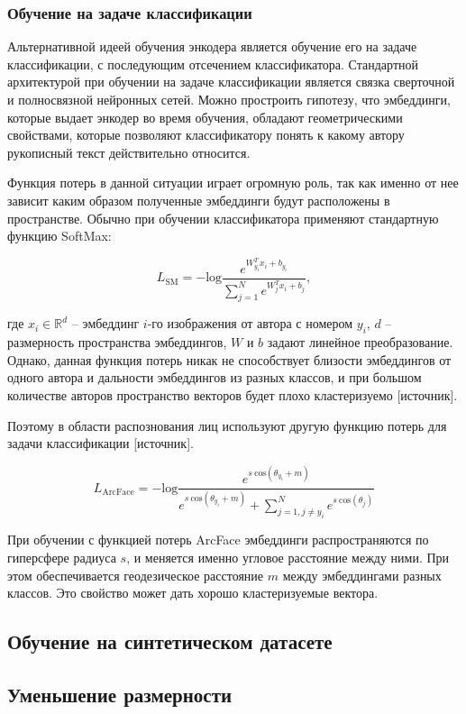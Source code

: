 \subsubsection{Обучение на задаче классификации}

Альтернативной идеей обучения энкодера является обучение его на задаче классификации, с последующим отсечением классификатора. Стандартной архитектурой при обучении на задаче классификации является связка сверточной и полносвязной нейронных сетей. Можно простроить гипотезу, что эмбеддинги, которые выдает энкодер во время обучения, обладают геометрическими свойствами, которые позволяют классификатору понять к какому автору рукописный текст действительно относится.

Функция потерь в данной ситуации играет огромную роль, так как именно от нее зависит каким образом полученные эмбеддинги будут расположены в пространстве. Обычно при обучении классификатора применяют стандартную функцию SoftMax:

$$
L_{\text{SM}} = -\text{log} \frac{e^{W_{y_i}^T x_i + b_{y_i}}}{\sum_{j=1}^{N} e^{W_{j}^T x_i + b_{j}}},
$$

\noindent
где $x_i \in \mathbb{R}^d$ -- эмбеддинг $i$-го изображения от автора с номером $y_i$, $d$ -- размерность пространства эмбеддингов, $W$ и $b$ задают линейное преобразование. Однако, данная функция потерь никак не способствует близости эмбеддингов от одного автора и дальности эмбеддингов из разных классов, и при большом количестве авторов пространство векторов будет плохо кластеризуемо [источник]. 

Поэтому в области распознования лиц используют другую функцию потерь для задачи классификации [источник]. 

$$
L_{\text{ArcFace}} = - \text{log} \frac{e^{s\:\text{cos}(\theta_{y_i} + m)}}
{e^{s\:\text{cos}(\theta_{y_i} + m)} + \sum^{N}_{j=1, j \neq y_i} e^{s\:\text{cos}(\theta_j)}}
$$

При обучении с функцией потерь ArcFace эмбеддинги распространяются по гиперсфере радиуса $s$, и меняется именно угловое расстояние между ними. При этом обеспечивается геодезическое расстояние $m$ между эмбеддингами разных классов. Это свойство может дать хорошо кластеризуемые вектора.

\subsection{Обучение на синтетическом датасете}

\subsection{Уменьшение размерности}

